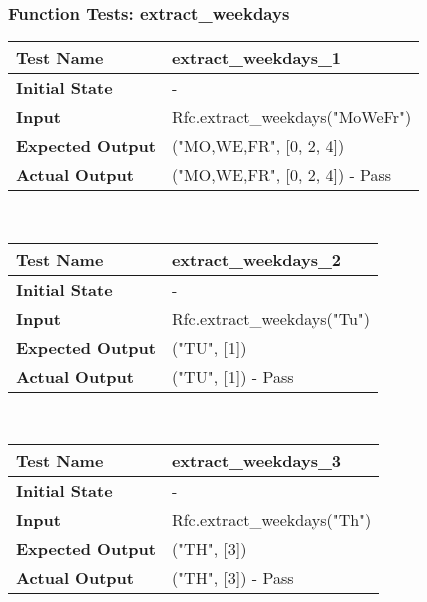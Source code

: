 \documentclass[12pt, titlepage]{article}
\begin{document}
    	\subsubsection{Function Tests: extract\_weekdays}
	    \begin{table}[!htbp]
			\begin{tabularx}{\textwidth}{|l|X|}%
				\hline
                \textbf{Test Name} & extract\_weekdays\_1  
                \\\hline
                \textbf{Initial State} & -
                \\\hline
                \textbf{Input} & Rfc.extract\_weekdays("MoWeFr")
                \\\hline 
                \textbf{Expected Output} & ("MO,WE,FR", [0, 2, 4])
                \\\hline
                \textbf{Actual Output} & ("MO,WE,FR", [0, 2, 4]) - Pass
                \\\hline
			\end{tabularx}\\ %
	    \end{table}
            \hfill	%
	    \begin{table}[!htbp]
			\begin{tabularx}{\textwidth}{|l|X|}%
				\hline
                \textbf{Test Name} & extract\_weekdays\_2  
                \\\hline
                \textbf{Initial State} & -
                \\\hline
                \textbf{Input} & Rfc.extract\_weekdays("Tu")
                \\\hline 
                \textbf{Expected Output} & ("TU", [1])
                \\\hline
                \textbf{Actual Output} & ("TU", [1]) - Pass
                \\\hline
			\end{tabularx}\\ %
	    \end{table}
            \hfill	%
	    \begin{table}[!htbp]
			\begin{tabularx}{\textwidth}{|l|X|}%
				\hline
                \textbf{Test Name} & extract\_weekdays\_3  
                \\\hline
                \textbf{Initial State} & -
                \\\hline
                \textbf{Input} & Rfc.extract\_weekdays("Th")
                \\\hline 
                \textbf{Expected Output} & ("TH", [3])
                \\\hline
                \textbf{Actual Output} & ("TH", [3]) - Pass
                \\\hline
			\end{tabularx}\\ %
	    \end{table}
\end{document}
